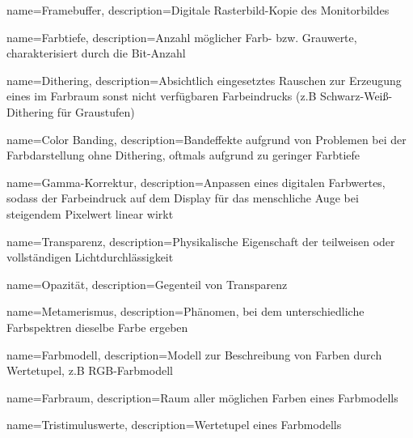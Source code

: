 {
  name=Framebuffer,
  description={Digitale Rasterbild-Kopie des Monitorbildes}
}

{
  name=Farbtiefe,
  description={Anzahl möglicher Farb- bzw. Grauwerte, charakterisiert durch die Bit-Anzahl}
}

{
  name=Dithering,
  description={Absichtlich eingesetztes Rauschen zur Erzeugung eines im Farbraum sonst nicht verfügbaren Farbeindrucks (z.B Schwarz-Weiß-Dithering für Graustufen)}
}

{
  name=Color Banding,
  description={Bandeffekte aufgrund von Problemen bei der Farbdarstellung ohne Dithering, oftmals aufgrund zu geringer Farbtiefe}
}

{
  name=Gamma-Korrektur,
  description={Anpassen eines digitalen Farbwertes, sodass der Farbeindruck auf dem Display für das menschliche Auge bei steigendem Pixelwert linear wirkt}
}

{
  name=Transparenz,
  description={Physikalische Eigenschaft der teilweisen oder vollständigen Lichtdurchlässigkeit}
}

{
  name=Opazität,
  description={Gegenteil von Transparenz}
}

{
  name=Metamerismus,
  description={Phänomen, bei dem unterschiedliche Farbspektren dieselbe Farbe ergeben}
}

{
  name=Farbmodell,
  description={Modell zur Beschreibung von Farben durch Wertetupel, z.B RGB-Farbmodell}
}

{
  name=Farbraum,
  description={Raum aller möglichen Farben eines Farbmodells}
}

{
  name=Tristimuluswerte,
  description={Wertetupel eines Farbmodells}
}

